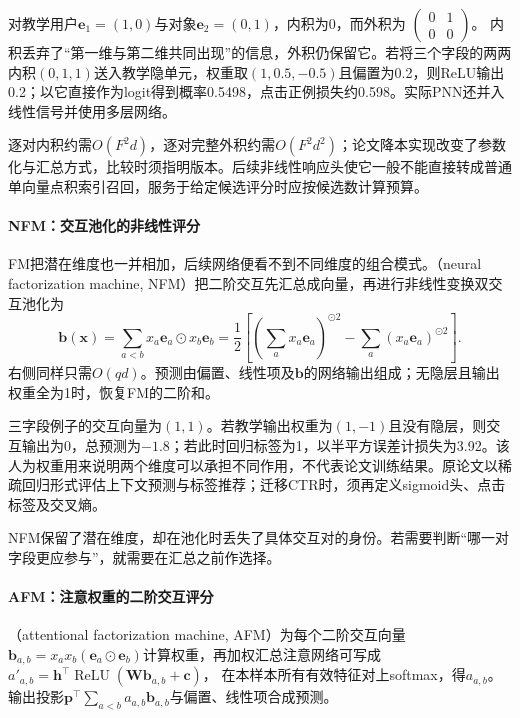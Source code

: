 对教学用户$\bm e_1=(1,0)$与对象$\bm e_2=(0,1)$，内积为0，而外积为
$\left(\begin{smallmatrix}0&1\\0&0\end{smallmatrix}\right)$。
内积丢弃了“第一维与第二维共同出现”的信息，外积仍保留它。若将三个字段的两两内积$(0,1,1)$送入教学隐单元，权重取$(1,0.5,-0.5)$且偏置为0.2，则ReLU输出0.2；以它直接作为logit得到概率0.5498，点击正例损失约0.598。实际PNN还并入线性信号并使用多层网络。

逐对内积约需$O(F^2d)$，逐对完整外积约需$O(F^2d^2)$；论文降本实现改变了参数化与汇总方式，比较时须指明版本。后续非线性响应头使它一般不能直接转成普通单向量点积索引召回，服务于给定候选评分时应按候选数计算预算。

\paragraph{NFM：交互池化的非线性评分}
\label{sec:rs-nfm}

FM把潜在维度也一并相加，后续网络便看不到不同维度的组合模式。（neural factorization machine, NFM）把二阶交互先汇总成向量，再进行非线性变换双交互池化为
\begin{equation}
 \bm b(\bm x)=\sum_{a<b}x_a\bm e_a\odot x_b\bm e_b
 =\frac12\left[
 \left(\sum_a x_a\bm e_a\right)^{\odot2}
 -\sum_a(x_a\bm e_a)^{\odot2}\right].
 \label{eq:rs-nfm}
\end{equation}
右侧同样只需$O(qd)$。预测由偏置、线性项及$\bm b$的网络输出组成；无隐层且输出权重全为1时，恢复FM的二阶和。

三字段例子的交互向量为$(1,1)$。若教学输出权重为$(1,-1)$且没有隐层，则交互输出为0，总预测为$-1.8$；若此时回归标签为1，以半平方误差计损失为3.92。该人为权重用来说明两个维度可以承担不同作用，不代表论文训练结果。原论文以稀疏回归形式评估上下文预测与标签推荐；迁移CTR时，须再定义sigmoid头、点击标签及交叉熵。

NFM保留了潜在维度，却在池化时丢失了具体交互对的身份。若需要判断“哪一对字段更应参与”，就需要在汇总之前作选择。

\Needspace{90mm}
\paragraph{AFM：注意权重的二阶交互评分}
\label{sec:rs-afm}

（attentional factorization machine, AFM）为每个二阶交互向量$\bm b_{a,b}=x_ax_b(\bm e_a\odot\bm e_b)$计算权重，再加权汇总注意网络可写成
$a'_{a,b}=\bm h^\top\operatorname{ReLU}(\bm W\bm b_{a,b}+\bm c)$，
在本样本所有有效特征对上softmax，得$a_{a,b}$。输出投影$\bm p^\top\sum_{a<b}a_{a,b}\bm b_{a,b}$与偏置、线性项合成预测。

